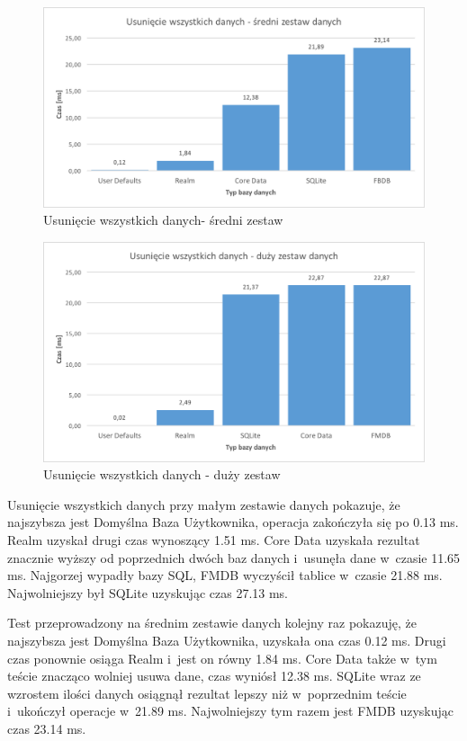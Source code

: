\begin{figure}[H]
\centering
	\includegraphics[width=15cm]{img/delete_data/delete_all/delete_all_medium_test.png}
	\caption{Usunięcie wszystkich danych- średni zestaw}
	\label{fig: delete-all-medium}
\end{figure}

\begin{figure}[H]
\centering
	\includegraphics[width=15cm]{img/delete_data/delete_all/delete_all_big_test.png}
	\caption{Usunięcie wszystkich danych - duży zestaw}
	\label{fig: delete-all-big}
\end{figure}

Usunięcie wszystkich danych przy małym zestawie danych pokazuje, że najszybsza jest Domyślna Baza Użytkownika, operacja zakończyła się po 0.13 ms. Realm uzyskał drugi czas wynoszący 1.51 ms. Core Data uzyskała rezultat znacznie wyższy od poprzednich dwóch baz danych i~usunęła dane w~czasie 11.65 ms. Najgorzej wypadły bazy SQL, FMDB wyczyścił tablice w~czasie 21.88 ms. Najwolniejszy był SQLite uzyskując czas 27.13 ms. 

Test przeprowadzony na średnim zestawie danych kolejny raz pokazuję, że najszybsza jest Domyślna Baza Użytkownika, uzyskała ona czas 0.12 ms. Drugi czas ponownie osiąga Realm i~jest on równy 1.84 ms. Core Data także w~tym teście znacząco wolniej usuwa dane, czas wyniósł 12.38 ms. SQLite wraz ze wzrostem ilości danych osiągnął rezultat lepszy niż w~poprzednim teście i~ukończył operacje w~21.89 ms. Najwolniejszy tym razem jest FMDB uzyskując czas 23.14 ms. 

